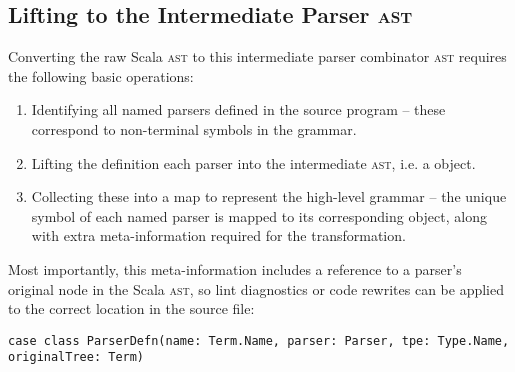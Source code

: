\documentclass[../../main.tex]{subfiles}
\begin{document}

\subsection{Lifting to the Intermediate Parser \textsc{ast}}
Converting the raw Scala \textsc{ast} to this intermediate parser combinator \textsc{ast} requires the following basic operations:
\begin{enumerate}
  \item Identifying all named parsers defined in the source program -- these correspond to non-terminal symbols in the grammar.
  \item Lifting the definition each parser into the intermediate \textsc{ast}, i.e. a  object.
  \item Collecting these into a map to represent the high-level grammar -- the unique symbol of each named parser is mapped to its corresponding  object, along with extra meta-information required for the transformation.
\end{enumerate}
%
Most importantly, this meta-information includes a reference to a parser's original node in the Scala \textsc{ast}, so lint diagnostics or code rewrites can be applied to the correct location in the source file:
\begin{verbatim}
case class ParserDefn(name: Term.Name, parser: Parser, tpe: Type.Name, originalTree: Term)
\end{verbatim}
\end{document}
